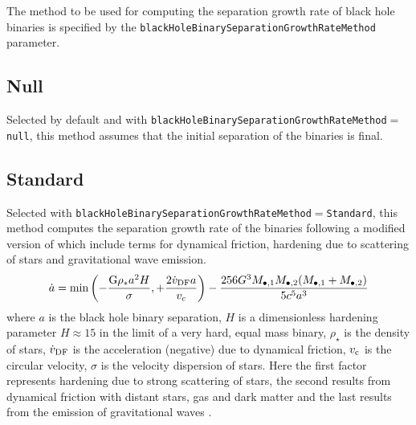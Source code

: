 The method to be used for computing the separation growth rate of black hole binaries is specified by the {\tt blackHoleBinarySeparationGrowthRateMethod} parameter.

\subsection{Null}

Selected by default and with {\tt blackHoleBinarySeparationGrowthRateMethod}$=${\tt null}, this method assumes that the initial separation of the binaries is final.

\subsection{Standard}

Selected with {\tt blackHoleBinarySeparationGrowthRateMethod}$=${\tt Standard}, this method computes the separation growth rate of the binaries following a modified version of \cite {volonteri_assembly_2003} which include terms for dynamical friction, hardening due to scattering of stars and gravitational wave emission.
\begin{equation}
\dot{a} = \hbox{min} \left( - \frac{{\rm G}\rho _{*}a^2 H}{\sigma}, +\frac{2 \dot{v}_{\rm DF} a}{v_c} \right) - \frac{256 G^3 M_{\bullet, 1} M_{\bullet, 2} (M_{\bullet, 1} +M_{\bullet, 2})}{5 c^5 a^3}
\end{equation}
where $a$ is the black hole binary
separation, $H$ is a dimensionless hardening parameter $H\approx 15$ in the limit of 
a very hard, equal mass binary, $\rho _\star$ is the density of stars,
$\dot{v}_{\rm DF}$ is the acceleration (negative) due to dynamical friction,
$v_{\rm c}$ is the circular velocity, $\sigma$ is the velocity dispersion of stars. Here the first factor represents hardening due to strong scattering of stars, the second results from dynamical friction with distant stars, gas and dark matter and the last results from the emission of gravitational waves \cite{peters_gravitational_1964}.

